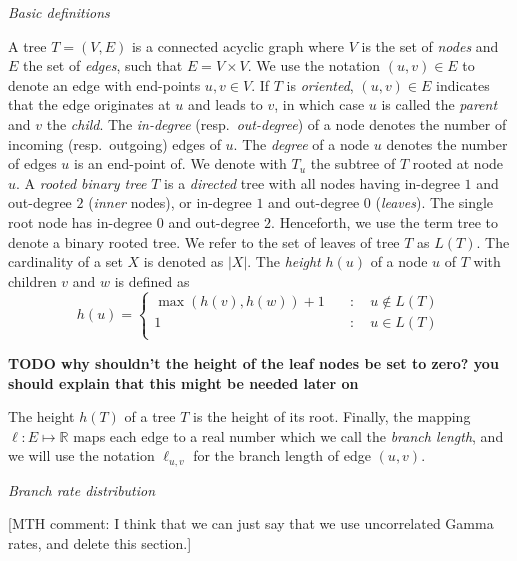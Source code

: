 \documentclass{llncs}
\newcommand{\mthcomment}[1]{{[\color{red}MTH comment: #1]}}
\renewcommand{\subsection}[1]{%
\bigskip
\begin{center}
\begin{large}
\normalfont\itshape #1
\end{large}
\end{center}}
\begin{document}
\subsection{Basic definitions}

%
A tree $T=(V,E)$ is a connected acyclic graph where $V$ is the set of {\em
nodes} and $E$ the set of {\em edges}, such that $E = V\times V$. We use the
notation $(u,v) \in E$ to denote an edge with end-points $u,v \in V$. If $T$ is
{\em oriented}, $(u,v) \in E$ indicates that the edge originates at $u$ and leads
to $v$, in which case $u$ is called the {\em parent} and $v$ the {\em child}.
The {\em in-degree} (resp.~{\em out-degree}) of a node denotes the
number of incoming (resp.~outgoing) edges of $u$. The
{\em degree} of a node $u$ denotes the number of edges $u$ is an end-point of.
We denote with $T_u$ the subtree of $T$ rooted at node $u$.  A {\em
rooted binary tree} $T$ is a {\em directed} tree with all nodes having
in-degree $1$ and out-degree $2$ ({\em inner} nodes), or in-degree $1$ and out-degree
$0$ ({\em leaves}). The single root node has in-degree $0$ and out-degree $2$.  
Henceforth, we use the term tree to denote a
binary rooted tree.  We refer to the set of leaves of tree $T$ as $L(T)$.  The
cardinality of a set $X$ is denoted as $|X|$. The {\em height} $h(u)$ of a node
$u$ of $T$ with children $v$ and $w$ is defined as 
%
\[ h(u) = \left\{ \begin{array}{ll}
\max(h(v), h(w)) + 1 & \quad : \quad u \notin L(T)\\
1                    & \quad : \quad u    \in L(T)\\
\end{array}\right. \] 

{\bf TODO why shouldn't the height of the leaf nodes be set to zero? you should explain that this might be needed later on}

The height $h(T)$ of a tree $T$ is the height of its root. Finally, the mapping $\ell : E \mapsto \mathbb{R}$ maps
each edge to a real number which we call the {\em branch length}, and we will use the notation $\ell_{u,v}$ for
the branch length of edge $(u,v)$. 

\subsection{Branch rate distribution}

\mthcomment{I think that we can just say that we use uncorrelated Gamma rates, and delete this section.}
\end{document}
